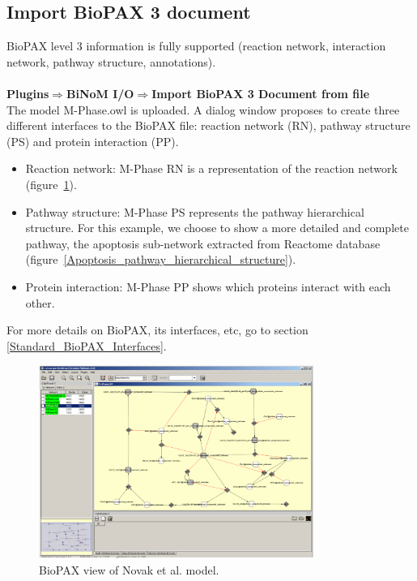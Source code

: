 \subsection{Import BioPAX 3 document}
BioPAX level 3 information is fully supported (reaction network, interaction network, pathway structure, annotations).\\\\
\textbf{Plugins$\Rightarrow$BiNoM  I/O$\Rightarrow$Import BioPAX 3 Document from file}\\
The model M-Phase.owl\cite{novak1998model} is uploaded. A dialog window proposes to create three different interfaces to the BioPAX file: reaction network (RN), pathway structure (PS) and protein interaction (PP).
\begin{itemize}
\item Reaction network: M-Phase RN is a representation of the reaction network (figure~\ref{View_BioPAX_of_Novak}).
\item Pathway structure: M-Phase PS represents the pathway hierarchical structure. For this example, we choose to show a more detailed and complete pathway, the apoptosis sub-network extracted from Reactome database (figure~\ref{Apoptosis_pathway_hierarchical_structure}).
\item Protein interaction: M-Phase PP shows which proteins interact with each other.
\end{itemize}
For more details on BioPAX, its interfaces, etc, go to section \ref{Standard_BioPAX_Interfaces}.
\begin{figure}
\centering
\includegraphics[width=0.8\textwidth]{graphics/View_BioPAX_of_Novak}
\caption{BioPAX view of Novak et al. model.}
\label{View_BioPAX_of_Novak}
\end{figure}
